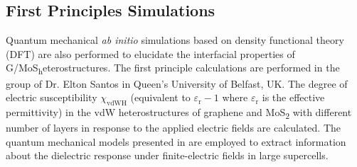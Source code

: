 \subsection{First Principles Simulations}
\label{sec:mult-theor-model}

Quantum mechanical \textit{ab initio} simulations based on
density functional theory (DFT) are also performed to elucidate the interfacial properties of G/MoS\textsubscript
heterostructures.
The first principle calculations are performed in the group of Dr. Elton Santos in Queen's University of Belfast, UK.
%
The degree of electric susceptibility $\chi_{\mathrm{vdWH}}$ (equivalent to
$\varepsilon_{\mathrm{r}} - 1$ where $\varepsilon_{\mathrm{r}}$ is the
effective permittivity) in the vdW heterostructures of graphene and
MoS\textsubscript{2} with different number of layers in response to
the applied electric fields are calculated.
%
The quantum mechanical models presented in
\autocite{Santos_2013_tunable_eps_gr,Santos_2013_ACSnano_kaxi} are
employed to extract information about the dielectric response under
finite-electric fields in large supercells.
%



